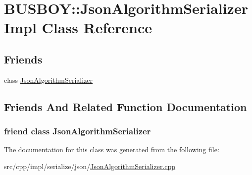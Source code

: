 \hypertarget{classBUSBOY_1_1JsonAlgorithmSerializerImpl}{
\section{BUSBOY::JsonAlgorithmSerializerImpl Class Reference}
\label{classBUSBOY_1_1JsonAlgorithmSerializerImpl}
}
\subsection*{Friends}
\begin{DoxyCompactItemize}
\item 
class \hyperlink{classBUSBOY_1_1JsonAlgorithmSerializerImpl_abdc40ac7b5746f42356de957c8186635}{JsonAlgorithmSerializer}
\end{DoxyCompactItemize}


\subsection{Friends And Related Function Documentation}
\hypertarget{classBUSBOY_1_1JsonAlgorithmSerializerImpl_abdc40ac7b5746f42356de957c8186635}{
\subsubsection[{JsonAlgorithmSerializer}]{\setlength{\rightskip}{0pt plus 5cm}friend class {\bf JsonAlgorithmSerializer}}}
\label{classBUSBOY_1_1JsonAlgorithmSerializerImpl_abdc40ac7b5746f42356de957c8186635}


The documentation for this class was generated from the following file:\begin{DoxyCompactItemize}
\item 
src/cpp/impl/serialize/json/\hyperlink{JsonAlgorithmSerializer_8cpp}{JsonAlgorithmSerializer.cpp}\end{DoxyCompactItemize}
